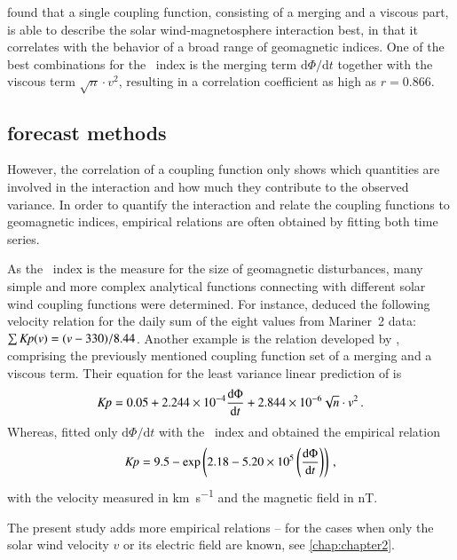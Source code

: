 \begin{itemize*}
	\item \citet{Newell2008} found that a single coupling function, consisting of a merging and a viscous part, is able to describe the solar wind-magnetosphere interaction best, in that it correlates with the behavior of a broad range of geomagnetic indices. One of the best combinations for the \Kp~index is the merging term $\text{d}\Phi / \text{d}t$ together with the viscous term $\sqrt{n} \cdot v^2$, resulting in a correlation coefficient as high as $r = 0.866$.
	
\end{itemize*}


\subsection{\Kp{} forecast methods}
However, the correlation of a coupling function only shows which quantities are involved in the interaction and how much they contribute to the observed variance. In order to quantify the interaction and relate the coupling functions to geomagnetic indices, empirical relations are often obtained by fitting both time series.

As the \Kp~index is the measure for the size of geomagnetic disturbances, many simple and more complex analytical functions connecting \Kp{} with different solar wind coupling functions were determined. For instance, \citet{Snyder1963} deduced the following velocity relation for the daily sum of the eight \Kp{} values from Mariner~2 data: $\sum \textit{Kp}(v) = (v - 330) / 8.44$. Another example is the relation developed by \citet{Newell2008}, comprising the previously mentioned coupling function set of a merging and a viscous term. Their equation for the least variance linear prediction of \Kp{} is
\begin{align}
	\textit{Kp}{} = 0.05 + \num{2.244e-4} \frac{\text{d}\Phi}{\text{d}t} + \num{2.844e-6} \sqrt{n} \cdot v^2	\,.
\end{align}
Whereas, \citet{Mays2015} fitted only $\text{d}\Phi / \text{d}t$ with the \Kp~index and obtained the empirical relation
\begin{align}
	\textit{Kp} = 9.5 - \exp\left(2.18 - \num{5.20e5} \left(\frac{\text{d}\Phi}{\text{d}t}\right)\right)	\,,
\end{align}
with the velocity measured in \si{\km\per\s} and the magnetic field in \si{\nano\tesla}.

The present study adds more empirical \Kp{} relations -- for the cases when only the solar wind velocity $v$ or its electric field \vBz{} are known, see \autoref{chap:chapter2}.

